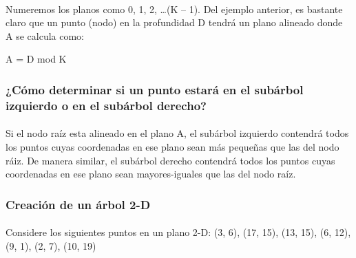 \documentclass{article}
\begin{document}
\paragraph{}
Numeremos los planos como 0, 1, 2, …(K – 1). Del ejemplo anterior, es bastante claro que un punto (nodo) en la profundidad D tendrá un plano alineado donde A se calcula como:

A = D mod K
\subsubsection{¿Cómo determinar si un punto estará en el subárbol izquierdo o en el subárbol derecho?}
\paragraph{}
Si el nodo raíz esta alineado en el plano A, el subárbol izquierdo contendrá todos los puntos cuyas coordenadas en ese plano sean más pequeñas que las del nodo ráiz. De manera similar, el subárbol derecho contendrá todos los puntos cuyas coordenadas en ese plano sean mayores-iguales que las del nodo raíz.

\subsubsection{Creación de un árbol 2-D}
\paragraph{}
Considere los siguientes puntos en un plano 2-D:
(3, 6), (17, 15), (13, 15), (6, 12), (9, 1), (2, 7), (10, 19)
\end{document}
